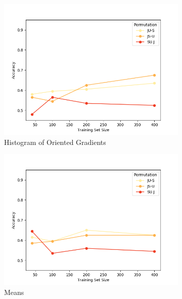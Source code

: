 \begin{figure}[ht]
  \centering
    \begin{subfigure}{.49\textwidth}
        \includegraphics[width=\textwidth]{images/classic-hog.png}
        \caption{Histogram of Oriented Gradients}
    \end{subfigure}
    \begin{subfigure}{.49\textwidth}
        \includegraphics[width=\textwidth]{images/classic-means.png}
        \caption{Means}
    \end{subfigure}
    \begin{subfigure}{.49\textwidth}

\end{subfigure}
\end{figure}
